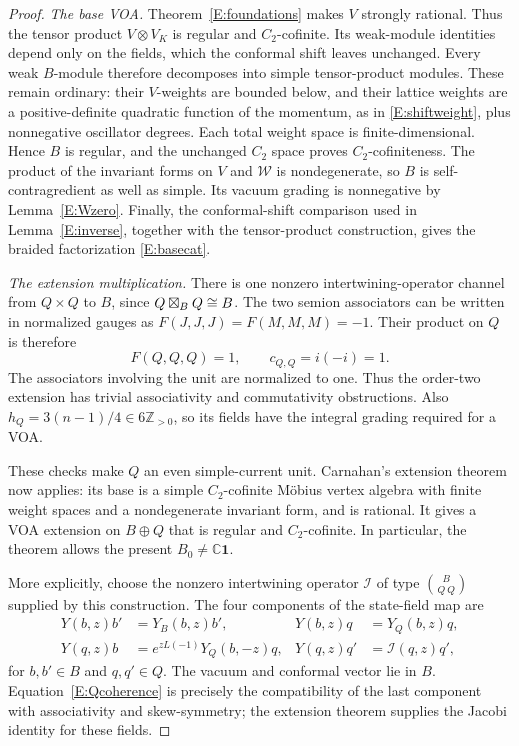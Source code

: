 \documentclass[11pt]{article}
\newcommand{\C}{\mathbb C}\newcommand{\Q}{\mathbb Q}\newcommand{\Z}{\mathbb Z}
\newcommand{\one}{\mathbf1}\newcommand{\D}{\mathcal D}\newcommand{\Dcat}{\mathcal D}
\numberwithin{equation}{section}
\begin{document}
\begin{proof}
\emph{The base VOA.} Theorem~\ref{E:foundations} makes $V$ strongly rational. Thus the tensor product $V\otimes V_K$ is regular and $C_2$-cofinite. Its weak-module identities depend only on the fields, which the conformal shift leaves unchanged. Every weak $B$-module therefore decomposes into simple tensor-product modules. These remain ordinary: their $V$-weights are bounded below, and their lattice weights are a positive-definite quadratic function of the momentum, as in \eqref{E:shiftweight}, plus nonnegative oscillator degrees. Each total weight space is finite-dimensional. Hence $B$ is regular, and the unchanged $C_2$ space proves $C_2$-cofiniteness. The product of the invariant forms on $V$ and $\mathcal W$ is nondegenerate, so $B$ is self-contragredient as well as simple. Its vacuum grading is nonnegative by Lemma~\ref{E:Wzero}. Finally, the conformal-shift comparison used in Lemma~\ref{E:inverse}, together with the tensor-product construction, gives the braided factorization \eqref{E:basecat}.

\emph{The extension multiplication.} There is one nonzero intertwining-operator channel from $Q\times Q$ to $B$, since $Q\boxtimes_B Q\cong B$. The two semion associators can be written in normalized gauges as $F(J,J,J)=F(M,M,M)=-1$. Their product on $Q$ is therefore
\begin{equation}\label{E:Qcoherence}
F(Q,Q,Q)=1,\qquad c_{Q,Q}=i(-i)=1.
\end{equation}
The associators involving the unit are normalized to one. Thus the order-two extension has trivial associativity and commutativity obstructions. Also $h_Q=3(n-1)/4\in6\Z_{>0}$, so its fields have the integral grading required for a VOA.

These checks make $Q$ an even simple-current unit. Carnahan's extension theorem \cite[Theorem~3.2.12]{E:Carnahan} now applies: its base is a simple $C_2$-cofinite M\"obius vertex algebra with finite weight spaces and a nondegenerate invariant form, and is rational. It gives a VOA extension on $B\oplus Q$ that is regular and $C_2$-cofinite. In particular, the theorem allows the present $B_0\neq\C\one$.

More explicitly, choose the nonzero intertwining operator $\mathcal I$ of type $\binom{B}{Q\ Q}$ supplied by this construction. The four components of the state-field map are
\begin{equation}\label{E:extensionfields}
\begin{aligned}
Y(b,z)b'&=Y_B(b,z)b',& Y(b,z)q&=Y_Q(b,z)q,\\
Y(q,z)b&=e^{zL(-1)}Y_Q(b,-z)q,& Y(q,z)q'&=\mathcal I(q,z)q',
\end{aligned}
\end{equation}
for $b,b'\in B$ and $q,q'\in Q$. The vacuum and conformal vector lie in $B$. Equation~\eqref{E:Qcoherence} is precisely the compatibility of the last component with associativity and skew-symmetry; the extension theorem supplies the Jacobi identity for these fields.


\end{proof}
\end{document}
